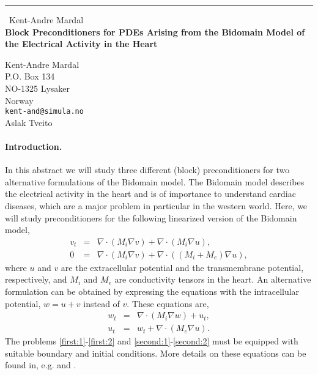 \documentclass{report}
\begin{document}
\begin{center}
\rule{6in}{1pt} \
{\large Kent-Andre Mardal \\
{\bf Block Preconditioners for PDEs Arising from the Bidomain Model of the Electrical Activity in the Heart}}

Kent-Andre Mardal \\ P.O. Box 134 \\ NO-1325 Lysaker \\ Norway
\\
{\tt kent-and@simula.no}\\
Aslak Tveito\end{center}


\renewcommand{\AA}{\mathcal{A}}
\newcommand{\BB}{\mathcal{B}}
\newcommand{\xx}{\mathcal{x}}
\newcommand{\bb}{\mathcal{b}}






\paragraph{Introduction.}

In this abstract we will study three different (block) preconditioners for
two alternative formulations of the Bidomain model.
The Bidomain model describes the electrical activity in
the heart and is of importance to understand cardiac
diseases, which are a major problem in particular in
the western world. Here, we will study preconditioners
for the following linearized version of the Bidomain model,
\begin{eqnarray}
\label{first:1}
v_t &=& \nabla\cdot(M_i\nabla v)+\nabla\cdot(M_i\nabla u),\\
\label{first:2}
0 &=& \nabla\cdot(M_i\nabla v)+\nabla\cdot((M_i+M_e)\nabla u),
\end{eqnarray}
where $u$ and $v$ are the extracellular potential and the transmembrane
potential, respectively,
and $M_i$ and $M_e$ are conductivity tensors in the heart.
An alternative formulation can be obtained by expressing the
equations with the intracellular potential, $w = u +v $ instead of $v$.
These equations are,
\begin{eqnarray}
\label{second:1}
w_t &=& \nabla\cdot(M_i\nabla w)+ u_t ,\\
\label{second:2}
u_t &=& w_t+\nabla\cdot(M_e\nabla u).
\end{eqnarray}
The problems \eqref{first:1}-\eqref{first:2}
and \eqref{second:1}-\eqref{second:2} must
be equipped with suitable boundary and initial
conditions.
More details on these equations can
be found in, e.g. \cite{Pennacchio} and \cite{block-mg}.
\end{document}
